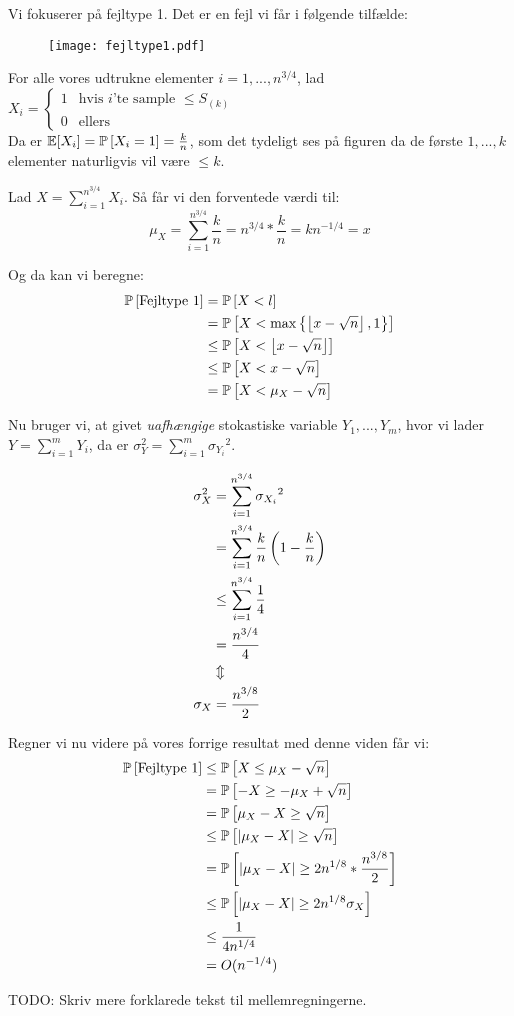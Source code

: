 Vi fokuserer på fejltype 1. Det er en fejl vi får i følgende tilfælde:
\begin{figure}[H]
  \begin{center}
  \texttt{[image: fejltype1.pdf]}
  \end{center}
  \label{fig:fejltype1}
\end{figure}




For alle vores udtrukne elementer $i = 1, ..., n^{3/4}$, lad
$
X_i =
\begin{cases}
	1 & \text{hvis $i$'te sample $\leq S_{(k)}$}\\
	0 & \text{ellers}
\end{cases}
$\\

Da er $\E[X_i] = \P{X_i = 1} = \frac{k}{n}$, som det tydeligt ses på figuren da de første $1, ..., k$ elementer naturligvis vil være $\leq k$.

Lad $X = \sum_{i=1}^{n^{3/4}} X_i$. Så får vi den forventede værdi til:
$$
\mu_X = \sum_{i=1}^{n^{3/4}} \frac{k}{n} = n^{3/4} * \frac{k}{n} = kn^{-1/4} = x
$$

Og da kan vi beregne:
\begin{align}
  \P{\text{Fejltype 1}} &= \P{X < l}\\
  &= \P{X < \max \left\{ \floor{x - \sqrt{n}}, 1 \right\} }\\
  &\leq \P{X < \floor{x - \sqrt{n}}}\\
  &\leq \P{X < x - \sqrt{n}}\\
  &= \P{X < \mu_X - \sqrt{n}}
\end{align}

Nu bruger vi, at givet \emph{uafhængige} stokastiske variable $Y_1, ..., Y_m$, hvor vi lader $Y = \sum_{i=1}^m Y_i$, da er $\sigma_Y^2 = \sum_{i=1}^m {\sigma_{Y_i}}^2$.

\begin{align}
  \sigma_X^2 &= \sum_{i=1}^{n^{3/4}} {\sigma_{X_i}}^2\\
  &= \sum_{i=1}^{n^{3/4}} \frac{k}{n} \p{ 1 - \frac{k}{n} }\\
  &\leq \sum_{i=1}^{n^{3/4}} \frac{1}{4}\\
  &= \frac{n^{3/4}}{4}\\
  &\Updownarrow\\
  \sigma_X &= \frac{n^{3/8}}{2}
\end{align}


Regner vi nu videre på vores forrige resultat med denne viden får vi:
\begin{align}
  \P{\text{Fejltype 1}} &\leq \P{X \leq \mu_X - \sqrt{n}}\\
  &= \P{-X \geq -\mu_X + \sqrt{n}}\\
  &= \P{\mu_X - X \geq \sqrt{n}}\\
  &\leq \P{|\mu_X - X| \geq \sqrt{n}}\\
  &= \P{|\mu_X - X| \geq 2n^{1/8} * \frac{n^{3/8}}{2}  }\\
  &\leq \P{ |\mu_X - X| \geq 2n^{1/8} \sigma_X }\\
  &\leq \frac{1}{4n^{1/4}}\\
  &= O(n^{-1/4})
\end{align}

TODO: Skriv mere forklarede tekst til mellemregningerne.

